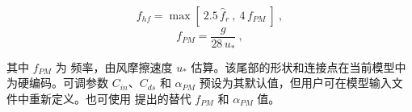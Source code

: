 
\begin{equation}
f_{hf} = \max \left [ \: 2.5 \, \hat{f}_r \: , \: 4 \,
f_{PM} \: \right ] \: ,
\label{eq:tail_WAM3}
\end{equation}
\begin{equation}
f_{PM} = \frac{g}{28 \, u_\ast} \: ,
\label{eq:f_PM}
\end{equation}

\noindent
其中 $f_{PM}$ 为 \cite{art:PM64} 频率，由风摩擦速度 $u_\ast$ 估算。该尾部的形状和连接点在当前模型中为硬编码。可调参数 $C_{in}$、$C_{ds}$ 和 $\alpha_{PM}$ 预设为其默认值，但用户可在模型输入文件中重新定义。也可使用 \cite{art:AlET03} 提出的替代 $f_{PM}$ 和 $\alpha_{PM}$ 值。

